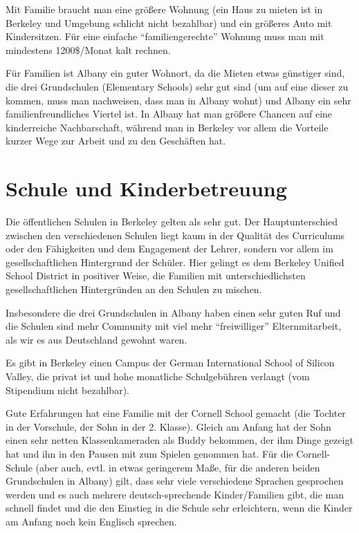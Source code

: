 \documentclass[a4paper]{scrreprt}
\begin{document}
Mit Familie braucht man eine größere Wohnung (ein Haus zu mieten ist in Berkeley und Umgebung schlicht nicht bezahlbar) und ein größeres Auto mit Kindersitzen. Für eine einfache "`familiengerechte"' Wohnung muss man mit  mindestens 1200\$/Monat kalt rechnen.

Für Familien ist Albany ein guter Wohnort, da die Mieten etwas günstiger sind, die drei Grundschulen (Elementary Schools) sehr gut sind (um auf eine dieser zu kommen, muss man nachweisen, dass man in Albany wohnt) und Albany ein sehr familienfreundliches Viertel ist. In Albany hat man größere Chancen auf eine kinderreiche Nachbarschaft, während man in Berkeley vor allem die Vorteile kurzer Wege zur Arbeit und zu den Geschäften hat.


\section{Schule und Kinderbetreuung}

Die öffentlichen Schulen in Berkeley gelten als sehr gut. Der Hauptunterschied zwischen den verschiedenen Schulen liegt kaum in der Qualität des Curriculums oder den Fähigkeiten und dem Engagement der Lehrer, sondern vor allem im gesellschaftlichen Hintergrund der Schüler. Hier gelingt es dem Berkeley Unified School District in positiver Weise, die Familien mit unterschiedlichsten gesellschaftlichen Hintergründen an den Schulen zu mischen.

Insbesondere die drei Grundschulen in Albany haben einen sehr guten Ruf und die Schulen sind mehr Community mit viel mehr "`freiwilliger"' Elternmitarbeit, als wir es aus Deutschland gewohnt waren.

Es gibt in Berkeley einen Campus der German International School of Silicon Valley, die privat ist und hohe monatliche Schulgebühren verlangt (vom Stipendium nicht bezahlbar).

Gute Erfahrungen hat eine Familie mit der Cornell School gemacht (die Tochter in der Vorschule, der Sohn in der 2. Klasse). Gleich am Anfang hat der Sohn einen sehr netten Klassenkameraden als Buddy bekommen, der ihm Dinge gezeigt hat und ihn in den Pausen mit zum Spielen genommen hat. Für die Cornell-Schule (aber auch, evtl. in etwas geringerem Maße, für die anderen beiden Grundschulen in Albany) gilt, dass sehr viele verschiedene Sprachen gesprochen werden und es auch mehrere deutsch-sprechende Kinder/Familien gibt, die man schnell findet und die den Einstieg in die Schule sehr erleichtern, wenn die Kinder am Anfang noch kein Englisch sprechen.
\end{document}
